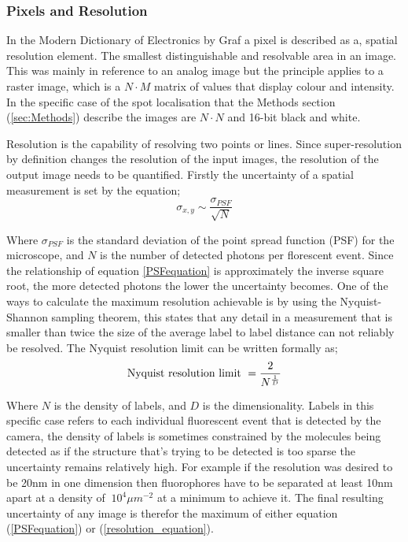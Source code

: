 \documentclass[aps,pra,a4paper,nofootinbib,onecolumn,tightenlines,longbibliography,12pt,amsfonts,amssymb,amsmath,floatfix]{revtex4-2} %
\begin{document}
  \subsubsection{Pixels and Resolution} %
  \label{ssub:Pixel}
   In the Modern Dictionary of Electronics by Graf a pixel is described as a, 
   spatial resolution element.
   The smallest distinguishable and resolvable area in an image.
   \cite{graf1997modern}
   This was mainly in reference to an analog image but the principle applies 
   to a raster image, which is a $N\cdot M$ matrix of values that display colour and
   intensity. In the specific case of the spot localisation that the Methods section 
   (\ref{sec:Methods}) describe the images are $N\cdot N$ and 16-bit black and white.

   Resolution is the capability of resolving two points or lines.
   Since super-resolution by definition changes the resolution of the input images, 
   the resolution of the output image needs to be quantified.
   Firstly the uncertainty of a spatial measurement is set by the equation;
   \begin{equation}\label{PSFequation}
   \sigma_{x,y}\sim\frac{\sigma_{PSF}}{\sqrt{N}}
   \end{equation}

   Where $\sigma_{PSF}$ is the standard deviation of the point spread function (PSF)
   for the microscope, and $N$ is the number of detected photons per florescent event.
   Since the relationship of equation \ref{PSFequation} is approximately the inverse square root, 
   the more detected photons the lower the uncertainty becomes.\cite{DEMPSEY2013561}
   One of the ways to calculate the maximum resolution achievable is by using the Nyquist-Shannon sampling theorem,
   this states that any detail in a measurement that is smaller than twice the size of the 
   average label to label distance can not reliably be resolved.\cite{tinnefeld2015far}
   The Nyquist resolution limit can be written formally as; 
   \begin{equation}\label{resolution_equation}
     \textrm{Nyquist resolution limit} \/\ =\frac{2}{N^{\frac{1}{D}}}
   \end{equation}

   Where $N$ is the density of labels, and $D$ is the dimensionality. 
   Labels in this specific case refers to each individual fluorescent event that is 
   detected by the camera, the density of labels is sometimes constrained by the 
   molecules being detected as if the structure that's trying to be detected is too
   sparse the uncertainty remains relatively high. 
   For example if the resolution was desired to be 20nm in 
   one dimension then fluorophores have to be separated at least 10nm apart at a density of 
   $~10^4\mu m^{-2}$ at a minimum to achieve it.
   The final resulting uncertainty of any image is therefor the maximum of either equation (\ref{PSFequation}) or (\ref{resolution_equation}). 
\end{document}
